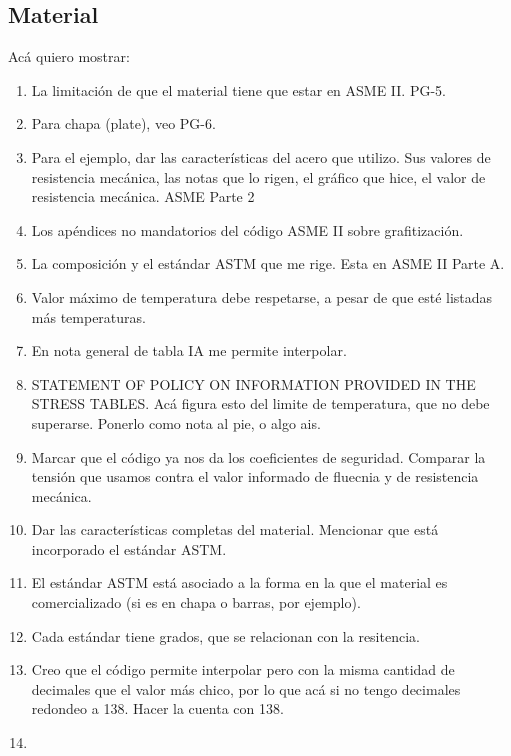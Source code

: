 


\subsection{Material}

Acá quiero mostrar:

\begin{enumerate}
     \item La limitación de que el material tiene que estar en ASME II. PG-5.
     \item Para chapa (plate), veo PG-6.
     \item Para el ejemplo, dar las características del acero que utilizo. Sus valores de resistencia mecánica, las notas que lo rigen, el gráfico que hice, el valor de resistencia mecánica. ASME Parte 2
     \item Los apéndices no mandatorios del código ASME II sobre grafitización.
     \item La composición y el estándar ASTM que me rige. Esta en ASME II Parte A.
     \item Valor máximo de temperatura debe respetarse, a pesar de que esté listadas más temperaturas.
     \item En nota general de tabla IA me permite interpolar.
     \item STATEMENT OF POLICY ON INFORMATION PROVIDED IN THE STRESS TABLES. Acá figura esto del limite de temperatura, que no debe superarse. Ponerlo como nota al pie, o algo ais.
     \item Marcar que el código ya nos da los coeficientes de seguridad. Comparar la tensión que usamos contra el valor informado de fluecnia y de resistencia mecánica.
     \item Dar las características completas del material. Mencionar que está incorporado el estándar ASTM.
     \item El estándar ASTM está asociado a la forma en la que el material es comercializado (si es en chapa o barras, por ejemplo).
     \item Cada estándar tiene grados, que se relacionan con la resitencia.
     \item Creo que el código permite interpolar pero con la misma cantidad de decimales que el valor más chico, por lo que acá si no tengo decimales redondeo a 138. Hacer la cuenta con 138.
     \item 
\end{enumerate}

